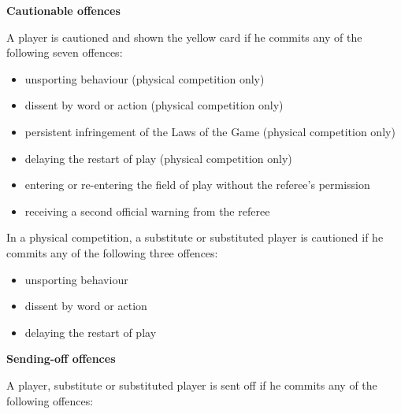 {\bfseries Cautionable offences }

\headlinebox

A player is cautioned and shown the yellow card if he commits any of the following seven offences:

\begin{itemize}
\item unsporting behaviour (physical competition only)
\item dissent by word or action (physical competition only)
\item persistent infringement of the Laws of the Game (physical competition only)
\item delaying the restart of play (physical competition only)
\item entering or re-entering the field of play without the referee's permission
\item receiving a second official warning from the referee
\end{itemize}

\bigskip

In a physical competition, a substitute or substituted player is cautioned if he commits any of the following three offences:

\begin{itemize}
\item unsporting behaviour
\item dissent by word or action
\item delaying the restart of play
\end{itemize}



{\bfseries Sending-off offences}

\headlinebox

A player, substitute or substituted player is sent off if he commits any of the following offences:

